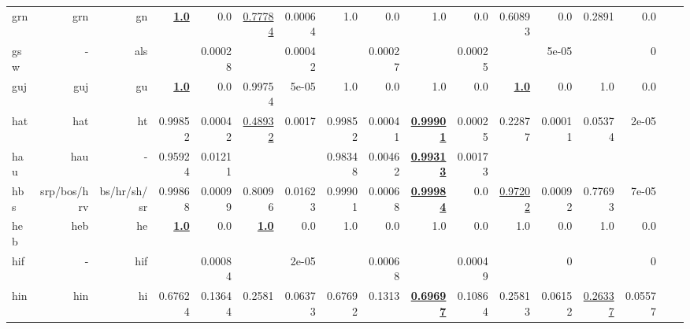 \documentclass[11pt]{article}
\begin{document}
\begin{table*}[h]
{\begin{tabular}{lrrrrrrrrrrrrrrrr}
grn         & grn         & gn         & \textbf{\underline{1.0}}         & 0.0         & \underline{0.77784}         & 0.00064         & 1.0         & 0.0         & 1.0         & 0.0         & 0.60893         & 0.0         & 0.2891         & 0.0         \\
gsw         & -         & als         &          & 0.00028         &          & 0.00042         &          & 0.00027         &          & 0.00025         &          & 5e-05         &          & 0         \\
guj         & guj         & gu         & \textbf{\underline{1.0}}         & 0.0         & 0.99754         & 5e-05         & 1.0         & 0.0         & 1.0         & 0.0         & \textbf{\underline{1.0}}         & 0.0         & 1.0         & 0.0         \\
hat         & hat         & ht         & 0.99852         & 0.00042         & \underline{0.48932}         & 0.0017         & 0.99852         & 0.00041         & \textbf{\underline{0.99901}}         & 0.00025         & 0.22877         & 0.00011         & 0.05374         & 2e-05         \\
hau         & hau         & -         & 0.95924         & 0.01211         &          &          & 0.98348         & 0.00462         & \textbf{\underline{0.99313}}         & 0.00173         &          &          &          &          \\
hbs         & srp/bos/hrv         & bs/hr/sh/sr         & 0.99868         & 0.00099         & 0.80096         & 0.01623         & 0.99901         & 0.00068         & \textbf{\underline{0.99984}}         & 0.0         & \underline{0.97202}         & 0.00092         & 0.77693         & 7e-05         \\
heb         & heb         & he         & \textbf{\underline{1.0}}         & 0.0         & \textbf{\underline{1.0}}         & 0.0         & 1.0         & 0.0         & 1.0         & 0.0         & 1.0         & 0.0         & 1.0         & 0.0         \\
hif         & -         & hif         &          & 0.00084         &          & 2e-05         &          & 0.00068         &          & 0.00049         &          & 0         &          & 0         \\
hin         & hin         & hi         & 0.67624         & 0.13644         & 0.2581         & 0.06373         & 0.67692         & 0.1313         & \textbf{\underline{0.69697}}         & 0.10864         & 0.25813         & 0.06152         & \underline{0.26337}         & 0.05577         \\

\end{tabular}}
\end{table*}
\end{document}
